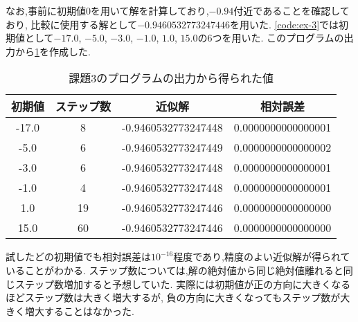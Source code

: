 \documentclass[autodetect-engine, dvi=dvipdfmx, 10pt, a4paper, ja=standard]{bxjsarticle}
\begin{document}
なお,事前に初期値0を用いて解を計算しており,$-0.94$付近であることを確認しており,
比較に使用する解として$-0.9460532773247446$を用いた.
\ref{code:ex-3}では初期値として$-17.0$, $-5.0$, $-3.0$, $-1.0$, $1.0$, $15.0$の6つを用いた.
このプログラムの出力から\ref{table:ex-3}を作成した.


\begin{table}[htbp]
	\centering
	\caption{課題3のプログラムの出力から得られた値}
	\label{table:ex-3}
	\begin{tabular}{@{}cccc@{}}
		\toprule
		初期値   & ステップ数 & 近似解                 & 相対誤差               \\ \midrule
		-17.0 & 8     & -0.9460532773247448 & 0.0000000000000001 \\
		-5.0  & 6     & -0.9460532773247449 & 0.0000000000000002 \\
		-3.0  & 6     & -0.9460532773247448 & 0.0000000000000001 \\
		-1.0  & 4     & -0.9460532773247448 & 0.0000000000000001 \\
		1.0   & 19    & -0.9460532773247446 & 0.0000000000000000 \\
		15.0  & 60    & -0.9460532773247446 & 0.0000000000000000 \\ \bottomrule
	\end{tabular}
\end{table}


試したどの初期値でも相対誤差は$10^{-16}$程度であり,精度のよい近似解が得られていることがわかる.
ステップ数については,解の絶対値から同じ絶対値離れると同じステップ数増加すると予想していた.
実際には初期値が正の方向に大きくなるほどステップ数は大きく増大するが,
負の方向に大きくなってもステップ数が大きく増大することはなかった.
\end{document}
